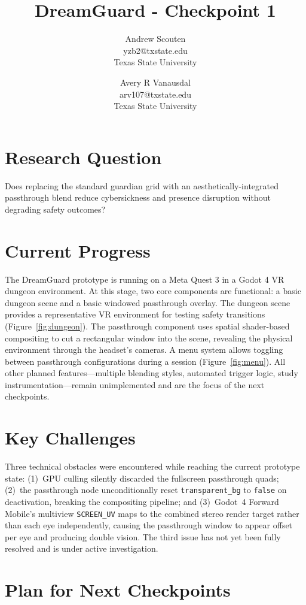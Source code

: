 \documentclass{styling/vgtc}                          %
\title{DreamGuard - Checkpoint 1}
\author{Andrew Scouten\\ %
        \scriptsize{yzb2@txstate.edu}\\ %
        \scriptsize Texas State University
\and Avery R Vanausdal\\ %
        \scriptsize{arv107@txstate.edu}\\ %
        \scriptsize Texas State University}
\begin{document}
\maketitle

\section*{Research Question}

Does replacing the standard guardian grid with an aesthetically-integrated
passthrough blend reduce cybersickness and presence disruption without degrading safety outcomes? 


\section*{Current Progress}

The DreamGuard prototype is running on a Meta Quest 3 in a Godot 4 VR dungeon
environment. At this stage, two core components are functional: a basic dungeon scene and a basic windowed passthrough overlay. The dungeon scene provides a representative VR environment for testing safety transitions (Figure~\ref{fig:dungeon}). The passthrough component uses spatial shader-based compositing to cut a rectangular window into the
scene, revealing the physical environment through the headset's cameras. A menu system allows toggling between passthrough configurations during a session (Figure~\ref{fig:menu}). All other planned features---multiple blending styles, automated trigger logic, study instrumentation---remain unimplemented and are the focus of the next checkpoints.


\section*{Key Challenges}

Three technical obstacles were encountered while reaching the current prototype state: (1)~GPU culling silently discarded the fullscreen passthrough quads; (2)~the passthrough node unconditionally reset \texttt{transparent\_bg} to \texttt{false} on deactivation, breaking the compositing pipeline; and
(3)~Godot~4 Forward Mobile's multiview \texttt{SCREEN\_UV} maps to the combined stereo render target rather than each eye independently, causing the passthrough window to appear offset per eye and producing double vision. The third issue has not yet been fully resolved and is under active investigation.


\section*{Plan for Next Checkpoints}
\end{document}
